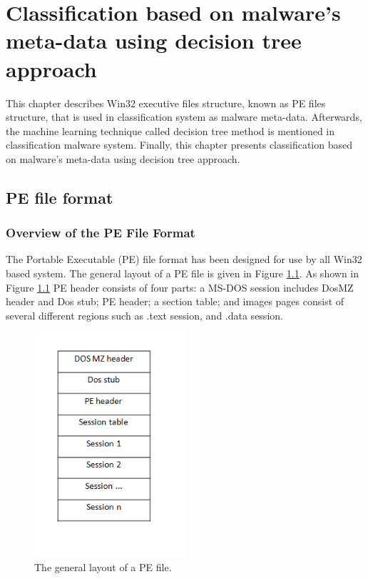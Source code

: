 \chapter{Classification based on malware's meta-data using decision tree approach}\label{chap:4}
%
%
This chapter describes Win32 executive files structure, known as PE files structure, that is used in classification system as malware meta-data. Afterwards, the machine learning technique called decision tree method is mentioned in classification malware system. Finally, this chapter presents classification based on malware's meta-data using decision tree approach. 

\section{PE file format\cite{peheaderci}}
\subsection{Overview of the PE File Format}

The Portable Executable (PE) file format has been designed for use by all Win32 based system. The general layout of a PE file is given in Figure \ref{fig:pefiles}. As shown in Figure \ref{fig:pefiles} PE header consists of four parts: a MS-DOS session includes DosMZ header and Dos stub; PE header; a section table; and images pages consist of several different regions such as .text session, and .data session.
\begin{figure}[h!]
\centering
\includegraphics[width=0.5\textwidth]{graph/pefiles.png}
\caption{The general layout of a PE file.}
\label{fig:pefiles}
\end{figure}

